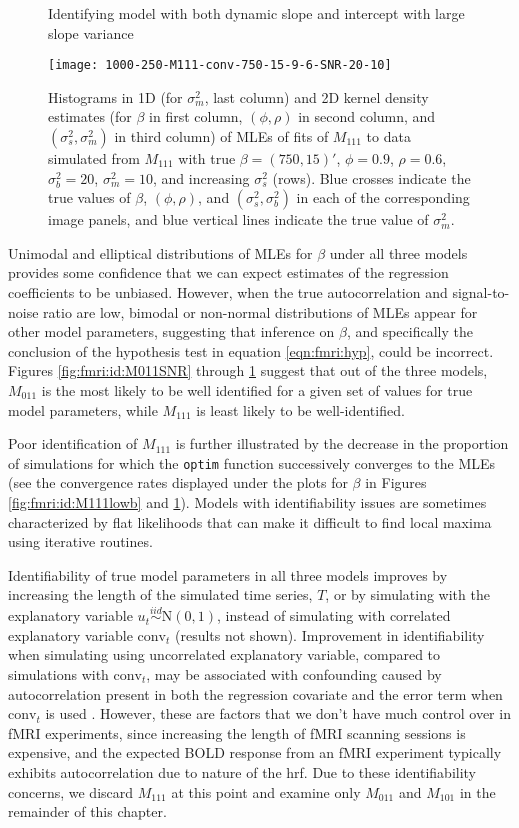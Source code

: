 \begin{figure}
\ssp
\centering
\caption{Identifying model with both dynamic slope and intercept with large slope variance} \label{fig:fmri:id:M111highb}
\texttt{[image: 1000-250-M111-conv-750-15-9-6-SNR-20-10]}
\caption*{Histograms in 1D (for $\sigma^2_m$, last column) and 2D kernel density estimates (for $\beta$ in first column, $(\phi,\rho)$ in second column, and $(\sigma^2_s,\sigma^2_m)$ in third column) of MLEs of fits of $M_{111}$ to data simulated from $M_{111}$ with true $\beta = (750,15)'$, $\phi = 0.9$, $\rho = 0.6$, $\sigma^2_b = 20$, $\sigma^2_m = 10$, and increasing $\sigma^2_s$ (rows). Blue crosses indicate the true values of $\beta$, $(\phi,\rho)$, and $(\sigma^2_s,\sigma^2_b)$ in each of the corresponding image panels, and blue vertical lines indicate the true value of $\sigma^2_m$.}
\end{figure}

Unimodal and elliptical distributions of MLEs for $\beta$ under all three models provides some confidence that we can expect estimates of the regression coefficients to be unbiased. However, when the true autocorrelation and signal-to-noise ratio are low, bimodal or non-normal distributions of MLEs appear for other model parameters, suggesting that inference on $\beta$, and specifically the conclusion of the hypothesis test in equation \eqref{eqn:fmri:hyp}, could be incorrect. Figures \ref{fig:fmri:id:M011SNR} through \ref{fig:fmri:id:M111highb} suggest that out of the three models, $M_{011}$ is the most likely to be well identified for a given set of values for true model parameters, while $M_{111}$ is least likely to be well-identified.

Poor identification of $M_{111}$ is further illustrated by the decrease in the proportion of simulations for which the {\tt optim} function successively converges to the MLEs (see the convergence rates displayed under the plots for $\beta$ in Figures \ref{fig:fmri:id:M111lowb} and \ref{fig:fmri:id:M111highb}). Models with identifiability issues are sometimes characterized by flat likelihoods that can make it difficult to find local maxima using iterative routines.

Identifiability of true model parameters in all three models improves by increasing the length of the simulated time series, $T$, or by simulating with the explanatory variable $u_t \stackrel{iid}{\sim} \mbox{N}(0,1)$, instead of simulating with correlated explanatory variable $\mbox{conv}_t$ (results not shown). Improvement in identifiability when simulating using uncorrelated explanatory variable, compared to simulations with $\mbox{conv}_t$, may be associated with confounding caused by autocorrelation present in both the regression covariate and the error term when $\mbox{conv}_t$ is used \citep{hodges:reich:confound:2010}. However, these are factors that we don't have much control over in fMRI experiments, since increasing the length of fMRI scanning sessions is expensive, and the expected BOLD response from an fMRI experiment typically exhibits autocorrelation due to nature of the hrf. Due to these identifiability concerns, we discard $M_{111}$ at this point and examine only $M_{011}$ and $M_{101}$ in the remainder of this chapter.

